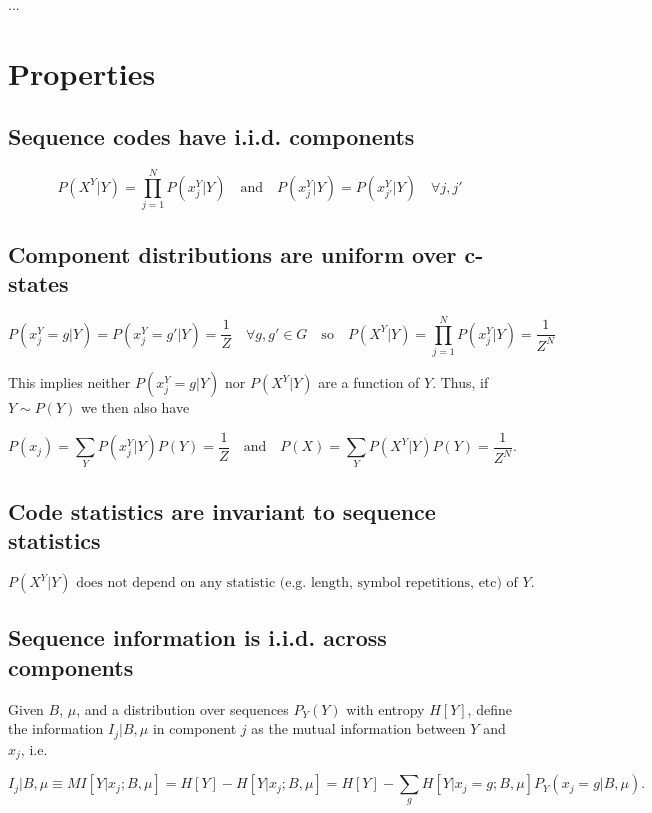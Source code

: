 \documentclass{article}
\begin{document}
...

\section{Properties}

\subsection{Sequence codes have i.i.d. components}
\label{sec:prop-comp-iid}

$$P(X^Y|Y) = \prod\limits_{j=1}^N P(x^Y_j|Y) \quad \textrm{and} \quad P(x^Y_j|Y) = P(x^Y_{j'}|Y) \quad \forall j, j'$$

\subsection{Component distributions are uniform over c-states}
\label{sec:prop-unif-comp-dstr}

$$P(x^Y_j = g|Y) = P(x^Y_j = g'|Y) = \frac{1}{Z} \quad \forall g, g' \in G \quad \textrm{so} \quad P(X^Y|Y) = \prod\limits_{j=1}^N P(x^Y_j|Y) = \frac{1}{Z^N}$$

This implies neither $P(x^Y_j = g|Y)$ nor $P(X^Y|Y)$ are a function of $Y$. Thus, if $Y \sim P(Y)$ we then also have

$$P(x_j) = \sum\limits_Y P(x^Y_j|Y)P(Y) = \frac{1}{Z} \quad \textrm{and} \quad P(X) = \sum\limits_Y P(X^Y|Y)P(Y) = \frac{1}{Z^N}.$$

\subsection{Code statistics are invariant to sequence statistics}

$$P(X^Y|Y) \textrm{ does not depend on any statistic (e.g. length, symbol repetitions, etc) of } Y.$$

\subsection{Sequence information is i.i.d. across components}
\label{sec:prop-info-iid}

Given $B$, $\mu$, and a distribution over sequences $P_Y(Y)$ with entropy $H[Y]$, define the information $I_j | B, \mu$ in component $j$ as the mutual information between $Y$ and $x_j$, i.e.

$$I_j | B, \mu \equiv MI[Y|x_j; B, \mu] = H[Y] - H[Y|x_j; B, \mu] = H[Y] - \sum_g H[Y|x_j = g; B, \mu] P_Y(x_j = g| B, \mu).$$
\end{document}
